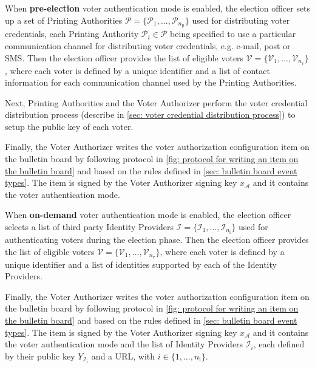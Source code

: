 When \textbf{pre-election} voter authentication mode is enabled, the election officer sets up a set of Printing Authorities $\boldsymbol{\mathcal{P}} = \{ \mathcal{P}_1, ..., \mathcal{P}_{n_\mathrm{p}} \}$ used for distributing voter credentials, each Printing Authority $\mathcal{P}_i \in \boldsymbol{\mathcal{P}}$ being specified to use a particular communication channel for distributing voter credentials, e.g. e-mail, post or SMS. Then the election officer provides the list of eligible voters $\boldsymbol{\mathcal{V}} = \{ \mathcal{V}_1, ..., \mathcal{V}_{n_\mathrm{v}} \}$, where each voter is defined by a unique identifier and a list of contact information for each communication channel used by the Printing Authorities.

Next, Printing Authorities and the Voter Authorizer perform the voter credential distribution process (describe in \cref{sec: voter credential distribution process}) to setup the public key of each voter.

Finally, the Voter Authorizer writes the voter authorization configuration item on the bulletin board by following protocol in \cref{fig: protocol for writing an item on the bulletin board} and based on the rules defined in \cref{sec: bulletin board event types}. The item is signed by the Voter Authorizer signing key $x_\mathcal{A}$ and it contains the voter authentication mode.

When \textbf{on-demand} voter authentication mode is enabled, the election officer selects a list of third party Identity Providers $\boldsymbol{\mathcal{I}} = \{ \mathcal{I}_1, ..., \mathcal{I}_{n_\mathrm{i}} \}$ used for authenticating voters during the election phase. Then the election officer provides the list of eligible voters $\boldsymbol{\mathcal{V}} = \{ \mathcal{V}_1, ..., \mathcal{V}_{n_\mathrm{v}} \}$, where each voter is defined by a unique identifier and a list of identities supported by each of the Identity Providers.

Finally, the Voter Authorizer writes the voter authorization configuration item on the bulletin board by following protocol in \cref{fig: protocol for writing an item on the bulletin board} and based on the rules defined in \cref{sec: bulletin board event types}. The item is signed by the Voter Authorizer signing key $x_\mathcal{A}$ and it contains the voter authentication mode and the list of Identity Providers $\mathcal{I}_i$, each defined by their public key $Y_{\mathcal{I}_i}$ and a URL, with $i \in \{ 1, ..., n_\mathrm{i} \}$.


